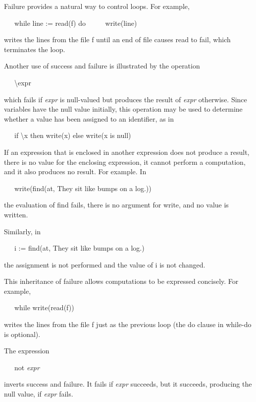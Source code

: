 Failure provides a natural way to control loops. For example,

{\ttfamily\mdseries
\ \ \ while line := read(f) do\newline
 \ \ \ \ \ write(line)}


writes the lines from the file f until an end of file causes read to fail, which terminates the loop.


Another use of success and failure is illustrated by the operation

{\ttfamily\mdseries
\ \ \ {\textbackslash}expr}


which fails if \textit{expr }is null-valued but produces the result of \textit{expr }otherwise. Since variables have the
null value initially, this operation may be used to determine whether a value has been assigned to an identifier, as
in

{\ttfamily\mdseries
\ \ \ if {\textbackslash}x then write(x) else write({\textquotedbl}x is null{\textquotedbl})}


If an expression that is enclosed in another expression does not produce a result, there is no value for the enclosing
expression, it cannot perform a computation, and it also produces no result. For example. In

{\ttfamily\mdseries
\ \ \ write(find({\textquotedbl}at{\textquotedbl}, {\textquotedbl}They sit like bumps on a log.{\textquotedbl}))}

\noindent the evaluation of find fails, there is no argument for write, and no value is written.

Similarly, in

{\ttfamily\mdseries
\ \ \ i := find({\textquotedbl}at{\textquotedbl}, {\textquotedbl}They sit like bumps on a log.{\textquotedbl})}

\noindent the assignment is not performed and the value of i is not changed.


This {\textquotedbl}inheritance{\textquotedbl} of failure allows computations to be expressed concisely. For example,

{\ttfamily\mdseries
\ \ \ while write(read(f))}

\noindent writes the lines from the file f just as the previous loop
(the do clause in while-do is optional).

The expression

{\ttfamily\mdseries
\ \ \ not \textit{expr}}

\noindent inverts success and failure. It fails if \textit{expr}
succeeds, but it succeeds, producing the null value, if \textit{expr}
fails.

